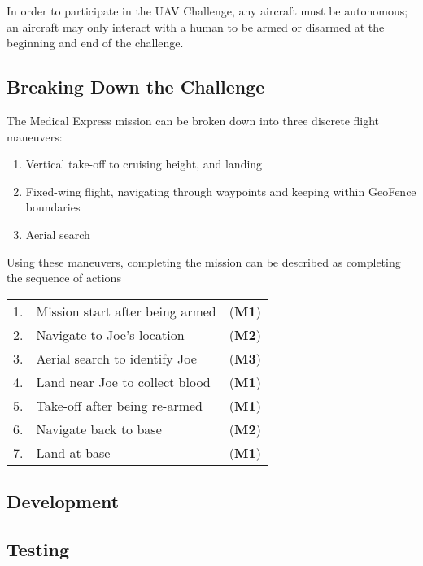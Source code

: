 In order to participate in the UAV Challenge, any aircraft must be autonomous; an aircraft may only interact with a human to be armed or disarmed at the beginning and end of the challenge.

\subsection{Breaking Down the Challenge}
\label{sec:flight}
The Medical Express mission can be broken down into three discrete flight maneuvers:
\begin{enumerate}[label=\bfseries M\arabic*:] \itemsep-2pt
	\item Vertical take-off to cruising height, and landing
	\item Fixed-wing flight, navigating through waypoints and keeping within GeoFence boundaries
	\item Aerial search
\end{enumerate}

Using these maneuvers, completing the mission can be described as completing the sequence of actions\\
\begin{tabular}{r l l}
	1. & Mission start after being armed & (\textbf{M1}) \\ 
	2. & Navigate to Joe's location & (\textbf{M2}) \\ 
	3. & Aerial search to identify Joe & (\textbf{M3}) \\ 
	4. & Land near Joe to collect blood & (\textbf{M1}) \\ 
	5. & Take-off after being re-armed & (\textbf{M1}) \\ 
	6. & Navigate back to base & (\textbf{M2}) \\ 
	7. & Land at base & (\textbf{M1}) \\ 
\end{tabular} 

\subsection{Development}


\subsection{Testing}
